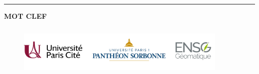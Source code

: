 \cleardoublepage
{}  
\pagestyle{empty}

\noindent
\textbf{\Large\MyTitle} \\

\noindent
\textbf{\textit{\MyAuthor}} \\
\noindent
\MyDate

\vspace{3mm}


\noindent
\rule{\textwidth}{0.7pt}


\vspace{5mm}




\vspace{10mm}


\noindent
\textbf{MOT CLEF}\\



\begin{figure}[b]

\centerline{\includegraphics[width=4in,height=1in]{figures/logos/logos3.jpg}}
\end{figure}



\clearpage

\restoregeometry











